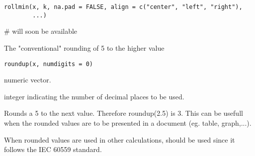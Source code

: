 \documentclass[a4paper]{book}
\begin{document}
%
\begin{Usage}
\begin{verbatim}
rollmin(x, k, na.pad = FALSE, align = c("center", "left", "right"),
        ...)
\end{verbatim}
\end{Usage}
%
\begin{Arguments}
\begin{ldescription}
\item[\code{x}] 


\item[\code{k}] 


\item[\code{na.pad}] 


\item[\code{align}] 


\item[\code{...}] 


\end{ldescription}
\end{Arguments}
%
\begin{Examples}
\begin{ExampleCode}
# will soon be available
\end{ExampleCode}
\end{Examples}
\newpage
{}
%
\begin{Description}\relax
The "conventional" rounding of 5 to the higher value
\end{Description}
%
\begin{Usage}
\begin{verbatim}
roundup(x, numdigits = 0)
\end{verbatim}
\end{Usage}
%
\begin{Arguments}
\begin{ldescription}
\item[\code{x}] numeric vector.
\item[\code{digits}] integer indicating the number of decimal places to be used.
\end{ldescription}
\end{Arguments}
%
\begin{Details}\relax

Rounds a 5 to the next value. Therefore roundup(2.5) is 3.
This can be usefull when the rounded values are to be presented in a document (eg. table, graph,...).

When rounded values are used in other calculations,  should be
used since it follows the IEC 60559 standard.
\end{Details}
\end{document}
